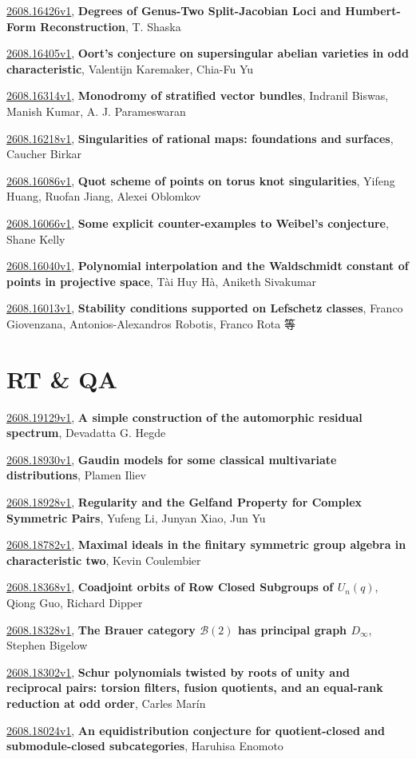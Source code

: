 \documentclass[9pt, a4paper]{article}
\theoremstyle{plain}
\theoremstyle{definition}
\theoremstyle{remark}
\newcommand{\arxiv}[3]{\href{https://arxiv.org/abs/#1}{#1}, \textbf{\textcolor{arxivblue}{#2}}, #3}
\begin{document}
\arxiv{2608.16426v1}{Degrees of Genus-Two Split-Jacobian Loci and Humbert-Form Reconstruction}{T. Shaska}

\arxiv{2608.16405v1}{Oort's conjecture on supersingular abelian varieties in odd characteristic}{Valentijn Karemaker, Chia-Fu Yu}

\arxiv{2608.16314v1}{Monodromy of stratified vector bundles}{Indranil Biswas, Manish Kumar, A. J. Parameswaran}

\arxiv{2608.16218v1}{Singularities of rational maps: foundations and surfaces}{Caucher Birkar}

\arxiv{2608.16086v1}{Quot scheme of points on torus knot singularities}{Yifeng Huang, Ruofan Jiang, Alexei Oblomkov}

\arxiv{2608.16066v1}{Some explicit counter-examples to Weibel's conjecture}{Shane Kelly}

\arxiv{2608.16040v1}{Polynomial interpolation and the Waldschmidt constant of points in projective space}{Tài Huy Hà, Aniketh Sivakumar}

\arxiv{2608.16013v1}{Stability conditions supported on Lefschetz classes}{Franco Giovenzana, Antonios-Alexandros Robotis, Franco Rota 等}


\section{RT \& QA}
\arxiv{2608.19129v1}{A simple construction of the automorphic residual spectrum}{Devadatta G. Hegde}

\arxiv{2608.18930v1}{Gaudin models for some classical multivariate distributions}{Plamen Iliev}

\arxiv{2608.18928v1}{Regularity and the Gelfand Property for Complex Symmetric Pairs}{Yufeng Li, Junyan Xiao, Jun Yu}

\arxiv{2608.18782v1}{Maximal ideals in the finitary symmetric group algebra in characteristic two}{Kevin Coulembier}

\arxiv{2608.18368v1}{Coadjoint orbits of Row Closed Subgroups of $U_n(q)$}{Qiong Guo, Richard Dipper}

\arxiv{2608.18328v1}{The Brauer category $\mathcal{B}(2)$ has principal graph $D_\infty$}{Stephen Bigelow}

\arxiv{2608.18302v1}{Schur polynomials twisted by roots of unity and reciprocal pairs: torsion filters, fusion quotients, and an equal-rank reduction at odd order}{Carles Marín}

\arxiv{2608.18024v1}{An equidistribution conjecture for quotient-closed and submodule-closed subcategories}{Haruhisa Enomoto}
\end{document}
